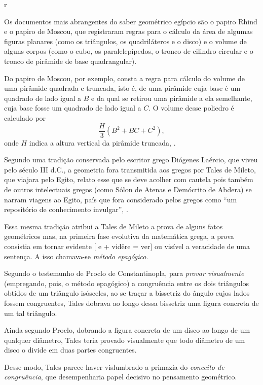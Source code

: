 r\documentclass{hipatia}
\begin{document}
Os documentos mais abrangentes do saber geométrico egípcio são o papiro Rhind e o papiro de Moscou, que registraram regras para o cálculo da área de algumas figuras planares (como os triângulos, os quadriláteros e o disco) e o volume de alguns corpos (como o cubo, os paralelepípedos, o tronco de cilindro circular e o tronco de pirâmide de base quadrangular).

Do papiro de Moscou, por exemplo, consta a regra para cálculo do volume de uma pirâmide quadrada e truncada, isto é, de uma pirâmide cuja base é um quadrado de lado igual a $B$ e da qual se retirou uma pirâmide a ela semelhante, cuja base fosse um quadrado de lado igual a $C$. O volume desse poliedro é calculado por $$\frac{H}{3}\left(B^2 + BC + C^2\right),$$ onde $H$ indica a altura vertical da pirâmide truncada, \cite[p. 7]{anglin1995}.

Segundo uma tradição conservada pelo escritor grego Diógenes Laércio, que viveu pelo século III d.C., a geometria fora transmitida aos gregos por Tales de Mileto, que viajara pelo Egito, relato esse que se deve acolher com cautela pois também de outros intelectuais gregos (como Sólon de Atenas e Demócrito de Abdera) se narram viagens ao Egito, país que fora considerado pelos gregos como ``um repositório de conhecimento invulgar'', \cite[p. 11]{momigliano1991}.

Essa mesma tradição atribui a Tales de Mileto a prova de alguns fatos geométricos mas, na primeira fase evolutiva da matemática grega, a prova consistia em tornar evidente  [ e + vidêre = ver]  ou visível a veracidade de uma sentença. A isso chamava-se \emph{método epagógico}. \cite[p. 127--128]{otte2006}

Segundo o testemunho de Proclo de Constantinopla, para \emph{provar visualmente} (empregando, pois, o método epagógico) a congruência entre os dois triângulos obtidos de um triângulo isósceles, ao se traçar a bissetriz do ângulo cujos lados fossem congruentes, Tales dobrava ao longo dessa bissetriz uma figura concreta de um tal triângulo. 

Ainda segundo Proclo, dobrando a figura concreta de um disco ao longo de um qualquer diâmetro, Tales teria provado visualmente que todo diâmetro de um disco o divide em duas partes congruentes.  \cite[p. 25]{coolidge1940}\cite[p. 25]{mosterin1984}

Desse modo, Tales parece haver vislumbrado a primazia do \emph{conceito de congruência}, que desempenharia papel decisivo no pensamento geométrico. 
\end{document}
